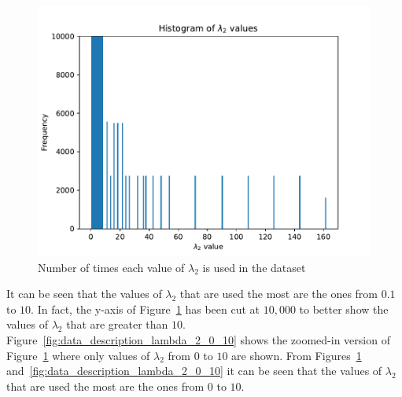 \begin{figure}[H]
    \centering
    \includegraphics[width=\linewidth]{chapters/05_numerical_results/Bin/descriptive/lambda_2_histogram.pdf}
    \caption{Number of times each value of \(\lambda_2\) is used in the dataset}
    \label{fig:data_description_lambda_2}
\end{figure}

It can be seen that the values of \(\lambda_2\) that are used the most are
the ones from \(0.1\) to \(10\).
In fact, the y-axis of Figure~\ref{fig:data_description_lambda_2} has been cut
at \(10,000\) to better show the values of \(\lambda_2\) that are greater than
\(10\).
Figure~\ref{fig:data_description_lambda_2_0_10} shows the zoomed-in version of
Figure~\ref{fig:data_description_lambda_2} where only values of \(\lambda_2\)
from \(0\) to \(10\) are shown.
From Figures~\ref{fig:data_description_lambda_2}
and~\ref{fig:data_description_lambda_2_0_10} it can be seen that the values of
\(\lambda_2\) that are used the most are the ones from \(0\) to \(10\).

